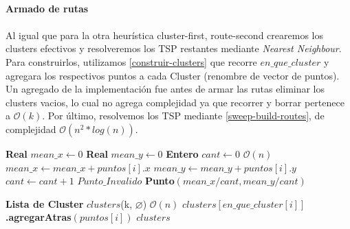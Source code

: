 \paragraph{Armado de rutas}
\paragraph{} Al igual que para la otra heurística cluster-first, route-second crearemos los clusters efectivos y resolveremos los TSP restantes mediante \textit{Nearest Neighbour}.  Para construirlos, utilizamos \ref{construir-clusters} que recorre $en\_que\_cluster$ y agregara los respectivos puntos a cada Cluster (renombre de vector de puntos). Un agregado de la implementación fue antes de armar las rutas eliminar los clusters vacios, lo cual no agrega complejidad ya que recorrer y borrar pertenece a $\mathcal{O}(k)$. Por último, resolvemos los TSP mediante \ref{sweep-build-routes}, de complejidad $\mathcal{O}(n^2*log(n))$.
\begin{algorithm}[H]
	\caption{\Comment $\mathcal{O}(n)$}
	\label{calcular-centroid}
	\begin{algorithmic}[1]
		\State \textbf{Real } $mean\_x \gets 0$
		\State \textbf{Real } $mean\_y \gets 0$
		\State \textbf{Entero } $cant \gets 0$
		 \Comment $\mathcal{O}(n)$
		\State $mean\_x \gets mean\_x + puntos[i].x$
		\State $mean\_y \gets mean\_y + puntos[i].y$
		\State $cant \gets cant+1$
		\EndIf
		\EndFor
		\State \Return $Punto\_Invalido$
		\EndIf
		\State \Return \textbf{Punto}$(mean\_x/cant, mean\_y/cant)$
		\EndFunction
	\end{algorithmic}
\end{algorithm}

\begin{algorithm}[H]
	\caption{\Comment $\mathcal{O}(n)$}
	\label{construir-clusters}
	\begin{algorithmic}[1]
		\State \textbf{Lista de Cluster} $clusters$(k, $\varnothing$)
		\Statex
		\Comment $\mathcal{O}(n)$
		\State $clusters[en\_que\_cluster[i]]$\textbf{.agregarAtras}$(puntos[i])$
		\EndFor
		\Statex
		\State \Return $clusters$
		\EndFunction
	\end{algorithmic}
\end{algorithm}

